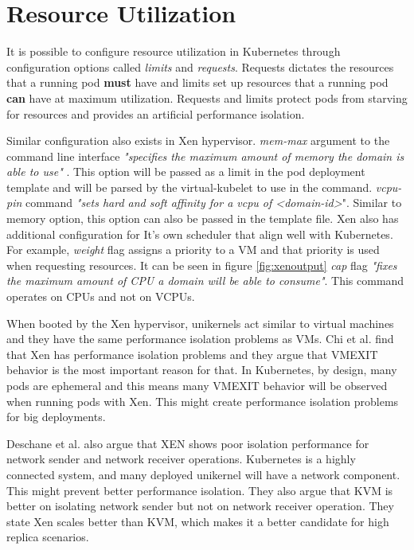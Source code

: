 \section{Resource Utilization}

It is possible to configure resource utilization in Kubernetes through configuration options called \textit{limits} and \textit{requests}. Requests dictates the resources that a running pod \textbf{must} have and limits set up resources that a running pod \textbf{can} have at maximum utilization. Requests and limits protect pods from starving for resources and provides an artificial performance isolation.

Similar configuration also exists in Xen hypervisor. \textit{mem-max} argument to the command line interface \textit{"specifies the maximum amount of memory the domain is able to use"} \cite{xl-man-page}. This option will be passed as a limit in the pod deployment template and will be parsed by the virtual-kubelet to use in the command. \textit{vcpu-pin} command \textit{"sets hard and soft affinity for a vcpu of <domain-id>}". Similar to memory option, this option can also be passed in the template file. Xen also has additional configuration for It's own scheduler that align well with Kubernetes. For example, \textit{weight} flag assigns a priority to a VM and that priority is used when requesting resources. It can be seen in figure \ref{fig:xenoutput} \textit{cap} flag \textit{"fixes the maximum amount of CPU a domain will be able to consume"}. This command operates on CPUs and not on VCPUs.

When booted by the Xen hypervisor, unikernels act similar to virtual machines and they have the same performance isolation problems as VMs. Chi et al. \cite{performance-isolation} find that Xen has performance isolation problems and they argue that VMEXIT behavior is the most important reason for that. In Kubernetes, by design, many pods are ephemeral and this means many VMEXIT behavior will be observed when running pods with Xen. This might create performance isolation problems for big deployments.

Deschane et al. \cite{Deshane} also argue that XEN shows poor isolation performance for network sender and network receiver operations. Kubernetes is a highly connected system, and many deployed unikernel will have a network component. This might prevent better performance isolation. They also argue that KVM is better on isolating network sender but not on network receiver operation. They state Xen scales better than KVM, which makes it a better candidate for high replica scenarios.